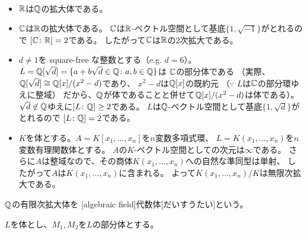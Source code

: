 \documentclass[report]{jlreq}
\begin{document}
\begin{example}[拡大体の例]
    ~
    \begin{itemize}
        \item $\mathbb{R}$は$\mathbb{Q}$の拡大体である。
        \item $\mathbb{C}$は$\mathbb{R}$の拡大体である。
            $\mathbb{C}$は$\mathbb{R}$-ベクトル空間として基底$\{1, \sqrt{-1}\}$がとれるので
            $[\mathbb{C} \colon \mathbb{R}] = 2$である。
            したがって$\mathbb{C}$は$\mathbb{R}$の2次拡大である。
        \item $d \neq 1$を square-free な整数とする（e.g. $d = 6$）。
            $L = \mathbb{Q}[\sqrt{d}] = \{ a + b\sqrt{d} \in \mathbb{Q} \colon a, b \in \mathbb{Q} \}$は
            $\mathbb{C}$の部分体である
            （実際、$\mathbb{Q}[\sqrt{d}] \cong \mathbb{Q}[x]/(x^2 - d)$であり、
            $x^2 - d$は$\mathbb{Q}[x]$の既約元
            （$\because$ $L$は$\mathbb{C}$の部分環ゆえに整域）
            だから、$\mathbb{Q}$が体であることと併せて$\mathbb{Q}[x]/(x^2 - d)$は体である）。
            $\sqrt{d} \not\in \mathbb{Q}$ゆえに$[L \colon \mathbb{Q}] \ge 2$である。
            $L$は$\mathbb{Q}$-ベクトル空間として基底$\{1, \sqrt{d}\}$がとれるので
            $[L \colon \mathbb{Q}] = 2$である。
        \item $K$を体とする。$A = K[x_1, \dots, x_n]$を$n$変数多項式環、
            $L = K(x_1, \dots, x_n)$を$n$変数有理関数体とする。
            $A$の$K$-ベクトル空間としての次元は$\infty$である。
            さらに$A$は整域なので、その商体$K(x_1, \dots, x_n)$への自然な準同型は単射、
            したがって$A$は$K(x_1, \dots, x_n)$に含まれる。
            よって$K(x_1, \dots, x_n)/K$は無限次拡大である。
    \end{itemize}
\end{example}

\begin{definition}[代数体]
    $\mathbb{Q}$の有限次拡大体を
    [algebraic field]{代数体}[だいすうたい]という。
\end{definition}

\begin{definition}[合成体]
    $L$を体とし、$M_1, M_2$を$L$の部分体とする。
    \TODO{}
\end{definition}
\end{document}
